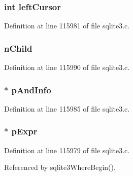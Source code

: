 \subsubsection[{left\+Cursor}]{\setlength{\rightskip}{0pt plus 5cm}int left\+Cursor}\label{struct_where_term_a5dfdebab7f5ce6a9e8c3985173ed6584}


Definition at line 115981 of file sqlite3.\+c.

\hypertarget{struct_where_term_ab94097e5c2844a5a1c3ec58e8acb9a3d}{}
\subsubsection[{n\+Child}]{ n\+Child}\label{struct_where_term_ab94097e5c2844a5a1c3ec58e8acb9a3d}


Definition at line 115990 of file sqlite3.\+c.

\hypertarget{struct_where_term_a150360a9358431e4d53420fc0779a1c1}{}
\subsubsection[{p\+And\+Info}]{$\ast$ p\+And\+Info}\label{struct_where_term_a150360a9358431e4d53420fc0779a1c1}


Definition at line 115985 of file sqlite3.\+c.

\hypertarget{struct_where_term_aab4193f0accd02e4c2e5e60e105c03ca}{}
\subsubsection[{p\+Expr}]{$\ast$ p\+Expr}\label{struct_where_term_aab4193f0accd02e4c2e5e60e105c03ca}


Definition at line 115979 of file sqlite3.\+c.



Referenced by sqlite3\+Where\+Begin().

\hypertarget{struct_where_term_a233fab5761379ed04adf6c216578c81a}{}
